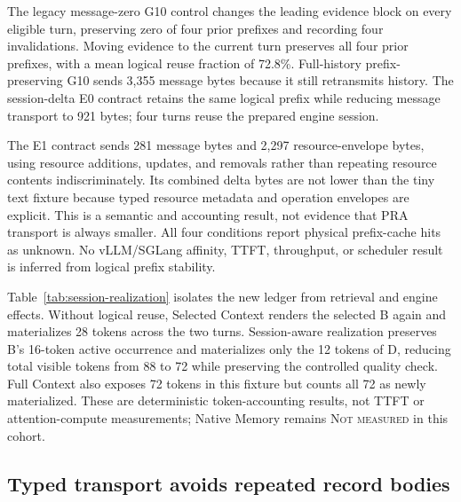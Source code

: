 \documentclass[11pt]{article}
\begin{document}
The legacy message-zero G10 control changes the leading evidence block on every
eligible turn, preserving zero of four prior prefixes and recording four
invalidations. Moving evidence to the current turn preserves all four prior
prefixes, with a mean logical reuse fraction of 72.8\%. Full-history
prefix-preserving G10 sends 3,355 message bytes because it still retransmits
history. The session-delta E0 contract retains the same logical prefix while
reducing message transport to 921 bytes; four turns reuse the prepared engine
session.

The E1 contract sends 281 message bytes and 2,297 resource-envelope bytes,
using resource additions, updates, and removals rather than repeating resource
contents indiscriminately. Its combined delta bytes are not lower than the
tiny text fixture because typed resource metadata and operation envelopes are
explicit. This is a semantic and accounting result, not evidence that PRA
transport is always smaller. All four conditions report physical prefix-cache
hits as unknown. No vLLM/SGLang affinity, TTFT, throughput, or scheduler result
is inferred from logical prefix stability.

\begin{table}[H]
\centering
\caption{Five-seed repeated-session accounting. Turn one selects A/B/C; turn
two selects B/D. Prefix-cache tokens, native reuse, and TTFT were not measured,
so they remain explicit rather than being inferred from logical visibility.}
\label{tab:session-realization}
\resizebox{\linewidth}{!}{}
\end{table}

Table~\ref{tab:session-realization} isolates the new ledger from retrieval and
engine effects. Without logical reuse, Selected Context renders the selected B
again and materializes 28 tokens across the two turns. Session-aware realization
preserves B's 16-token active occurrence and materializes only the 12 tokens of
D, reducing total visible tokens from 88 to 72 while preserving the controlled
quality check. Full Context also exposes 72 tokens in this fixture but counts all
72 as newly materialized. These are deterministic token-accounting results, not
TTFT or attention-compute measurements; Native Memory remains
\textsc{Not measured} in this cohort.

\subsection{Typed transport avoids repeated record bodies}
\end{document}
